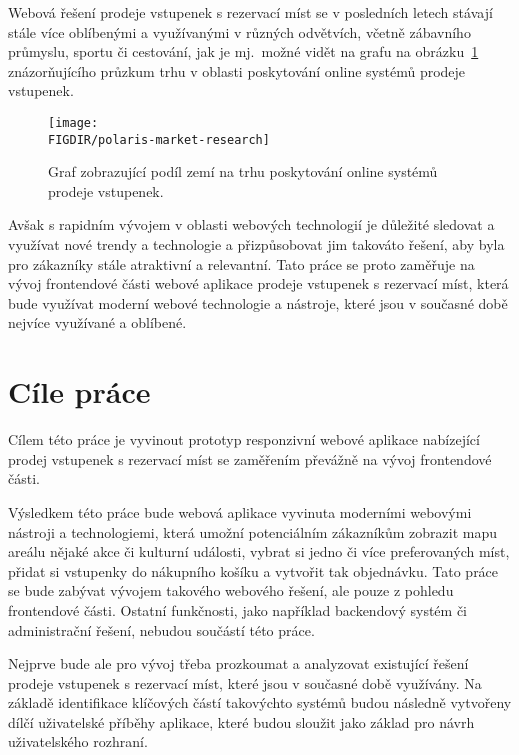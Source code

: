 Webová řešení prodeje vstupenek s rezervací míst se v posledních letech stávají stále více oblíbenými a využívanými v různých odvětvích, včetně zábavního průmyslu, sportu či cestování, jak je mj.\ možné vidět na grafu na obrázku~\ref{fig:polaris-market-research} znázorňujícího průzkum trhu v oblasti poskytování online systémů prodeje vstupenek.

\begin{figure}[H]
    \centering
    \caption{Graf zobrazující podíl zemí na trhu poskytování online systémů prodeje vstupenek.}
    \texttt{[image: \\FIGDIR/polaris-market-research]}
    \label{fig:polaris-market-research}
\end{figure}

Avšak s rapidním vývojem v oblasti webových technologií je důležité sledovat a využívat nové trendy a technologie a přizpůsobovat jim takováto řešení, aby byla pro zákazníky stále atraktivní a relevantní.
Tato práce se proto zaměřuje na vývoj frontendové části webové aplikace prodeje vstupenek s rezervací míst, která bude využívat moderní webové technologie a nástroje, které jsou v současné době nejvíce využívané a oblíbené.
\pagebreak

\section*{Cíle práce}
\label{sec:uvod-cile-prace}
Cílem této práce je vyvinout prototyp responzivní webové aplikace nabízející prodej vstupenek s rezervací míst se zaměřením převážně na vývoj frontendové části.

Výsledkem této práce bude webová aplikace vyvinuta moderními webovými nástroji a technologiemi, která umožní potenciálním zákazníkům zobrazit mapu areálu nějaké akce či kulturní události, vybrat si jedno či více preferovaných míst, přidat si vstupenky do nákupního košíku a vytvořit tak objednávku.
Tato práce se bude zabývat vývojem takového webového řešení, ale pouze z pohledu frontendové části.
Ostatní funkčnosti, jako například backendový systém či administrační řešení, nebudou součástí této práce.

Nejprve bude ale pro vývoj třeba prozkoumat a analyzovat existující řešení prodeje vstupenek s rezervací míst, které jsou v současné době využívány.
Na základě identifikace klíčových částí takovýchto systémů budou následně vytvořeny dílčí uživatelské příběhy aplikace, které budou sloužit jako základ pro návrh uživatelského rozhraní.

